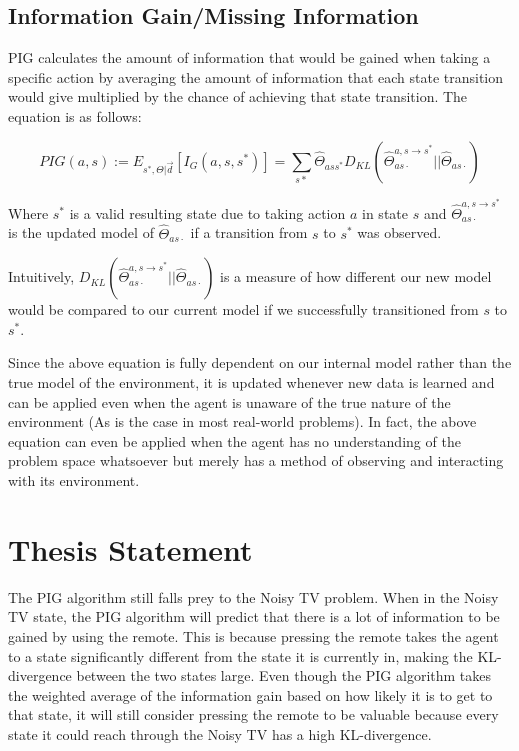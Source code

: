 \documentclass[12pt]{thesis}
\begin{document}
\subsection{Information Gain/Missing Information}
PIG calculates the amount of information that would be gained when taking a specific action by averaging the amount of information that each state transition would give multiplied by the chance of achieving that state transition. The equation is as follows:

\[ PIG(a,s) := E_{s^{*},\Theta|\vec{d}} [I_{G}(a,s,s^{*})] = \sum_{s*} \hat{\Theta}_{ass^{*}}D_{KL}(\hat{\Theta}_{as\cdot}^{a,s \rightarrow s^{*}} || \hat{\Theta}_{as\cdot}) \]

Where $s^{*}$ is a valid resulting state due to taking action $a$ in state $s$ and $\hat{\Theta}_{as\cdot}^{a,s \rightarrow s^{*}}$ is the updated model of $\hat{\Theta}_{as\cdot}$ if a transition from $s$ to $s^{*}$ was observed.

Intuitively, $D_{KL}(\hat{\Theta}_{as\cdot}^{a,s \rightarrow s^{*}} || \hat{\Theta}_{as\cdot})$ is a measure of how different our new model would be compared to our current model if we successfully transitioned from $s$ to $s^{*}$.

Since the above equation is fully dependent on our internal model rather than the true model of the environment, it is updated whenever new data is learned and can be applied even when the agent is unaware of the true nature of the environment (As is the case in most real-world problems). In fact, the above equation can even be applied when the agent has no understanding of the problem space whatsoever but merely has a method of observing and interacting with its environment.

\section{Thesis Statement}
The PIG algorithm still falls prey to the Noisy TV problem. When in the Noisy TV state, the PIG algorithm will predict that there is a lot of information to be gained by using the remote. This is because pressing the remote takes the agent to a state significantly different from the state it is currently in, making the KL-divergence between the two states large. Even though the PIG algorithm takes the weighted average of the information gain based on how likely it is to get to that state, it will still consider pressing the remote to be valuable because every state it could reach through the Noisy TV has a high KL-divergence.
\end{document}
